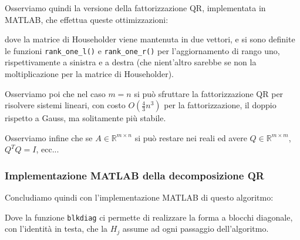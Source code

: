 \documentclass[a4paper,11pt]{article}
\begin{document}
Osserviamo quindi la versione della fattorizzazione QR, implementata in MATLAB, che effettua queste ottimizzazioni:

dove la matrice di Householder viene mantenuta in due vettori, e si sono definite le funzioni \lstinline|rank_one_l()| e \lstinline|rank_one_r()| per l'aggiornamento di rango uno, rispettivamente a sinistra e a destra (che nient'altro sarebbe se non la moltiplicazione per la matrice di Householder).

Osserviamo poi che nel caso $m = n$ si può sfruttare la fattorizzazione QR per risolvere sistemi lineari, con costo $O(\frac{4}{3}n^3)$ per la fattorizzazione, il doppio rispetto a Gauss, ma solitamente più stabile.

Osserviamo infine che se $A \in \mathbb{R}^{m \times n}$ si può restare nei reali ed avere $Q \in \mathbb{R}^{m \times m}$, $Q^T Q = I$, ecc...

\subsubsection{Implementazione MATLAB della decomposizione QR}
Concludiamo quindi con l'implementazione MATLAB di questo algoritmo:

Dove la funzione \lstinline|blkdiag| ci permette di realizzare la forma a blocchi diagonale, con l'identità in testa, che la $H_j$ assume ad ogni passaggio dell'algoritmo.
\end{document}
